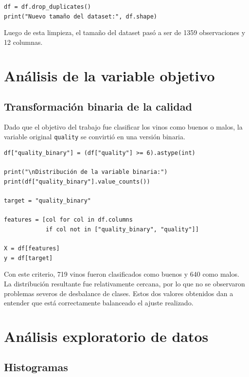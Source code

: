 \documentclass[conference]{IEEEtran}
\begin{document}
\begin{lstlisting}[caption={Eliminación de filas duplicadas}, label={lst:dropdup}]
df = df.drop_duplicates()
print("Nuevo tamaño del dataset:", df.shape)
\end{lstlisting}

Luego de esta limpieza, el tamaño del dataset pasó a ser de 1359 observaciones y 12 columnas.

\section{Análisis de la variable objetivo}

\subsection{Transformación binaria de la calidad}

Dado que el objetivo del trabajo fue clasificar los vinos como buenos o malos, la variable original \texttt{quality} se convirtió en una versión binaria.

\begin{lstlisting}[caption={Creación de la variable objetivo binaria}, label={lst:target}]
df["quality_binary"] = (df["quality"] >= 6).astype(int)

print("\nDistribución de la variable binaria:")
print(df["quality_binary"].value_counts())

target = "quality_binary"

features = [col for col in df.columns
            if col not in ["quality_binary", "quality"]]

X = df[features]
y = df[target]
\end{lstlisting}

Con este criterio, 719 vinos fueron clasificados como buenos y 640 como malos. La distribución resultante fue relativamente cercana, por lo que no se observaron problemas severos de desbalance de clases. Estos dos valores obtenidos dan a entender que está correctamente balanceado el ajuste realizado.

\section{Análisis exploratorio de datos}

\subsection{Histogramas}
\end{document}
